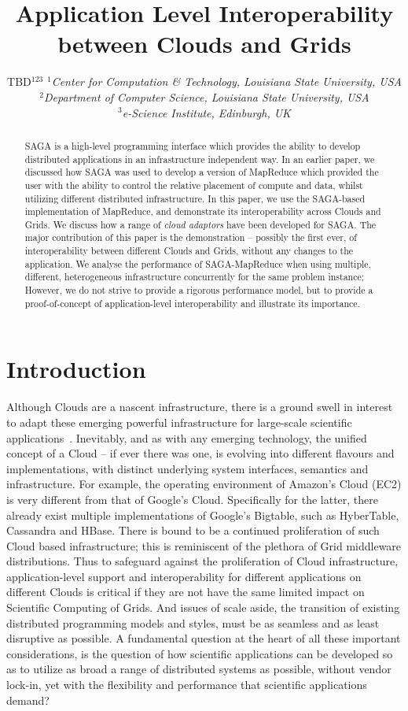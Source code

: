 \documentclass[conference,final]{IEEEtran}
\title{Application Level Interoperability between Clouds and Grids}
\author{TBD$^{123}$
  \small{\emph{$^{1}$Center for Computation \& Technology, Louisiana
      State University, USA}}\\
  \small{\emph{$^{2}$Department of Computer Science, Louisiana State
      University, USA}}\\
  \small{\emph{$^{3}$e-Science Institute, Edinburgh, UK}}\\
}
\newcommand{\sagamapreduce }{SAGA-MapReduce }
\begin{document}
\maketitle

\begin{abstract}
  SAGA is a high-level programming interface which provides the
  ability to develop distributed applications in an infrastructure
  independent way. In an earlier paper, we discussed how SAGA was used
  to develop a version of MapReduce which provided the user with the
  ability to control the relative placement of compute and data,
  whilst utilizing different distributed infrastructure. In this
  paper, we use the SAGA-based implementation of MapReduce, and
  demonstrate its interoperability across Clouds and Grids.  We
  discuss how a range of {\it cloud adaptors} have been developed for
  SAGA.  The major contribution of this paper is the demonstration --
  possibly the first ever, of interoperability between different
  Clouds and Grids, without any changes to the application. We analyse
  the performance of \sagamapreduce when using multiple, different,
  heterogeneous infrastructure concurrently for the same problem
  instance; However, we do not strive to provide a rigorous
  performance model, but to provide a proof-of-concept of
  application-level interoperability and illustrate its importance.
\end{abstract}

\section{Introduction} 
Although Clouds are a nascent infrastructure, there is a ground swell
in interest to adapt these emerging powerful infrastructure for
large-scale scientific applications~\cite{montagecloud}. Inevitably,
and as with any emerging technology, the unified concept of a Cloud --
if ever there was one, is evolving into different flavours and
implementations, with distinct underlying system interfaces, semantics
and infrastructure. For example, the operating environment of Amazon's
Cloud (EC2) is very different from that of Google's
Cloud. Specifically for the latter, there already exist multiple
implementations of Google's Bigtable, such as HyberTable, Cassandra
and HBase. There is bound to be a continued proliferation of such
Cloud based infrastructure; this is reminiscent of the plethora of
Grid middleware distributions. Thus to safeguard against the
proliferation of Cloud infrastructure, application-level support and
interoperability for different applications on different Clouds is
critical if they are not have the same limited impact on Scientific
Computing of Grids. And issues of scale aside, the transition of
existing distributed programming models and styles, must be as
seamless and as least disruptive as possible.  A fundamental question
at the heart of all these important considerations, is the question of
how scientific applications can be developed so as to utilize as broad
a range of distributed systems as possible, without vendor lock-in,
yet with the flexibility and performance that scientific applications
demand?
\end{document}
